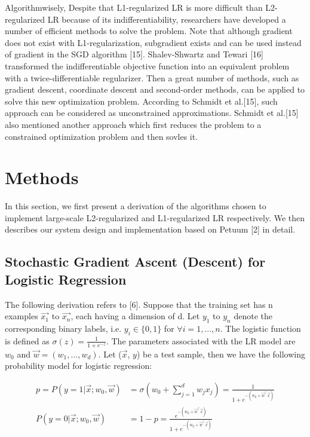 \documentclass{article} %
\begin{document}
Algorithmwisely, Despite that L1-regularized LR is more difficult than L2-regularized LR because of its indifferentiability, researchers have developed a number of efficient methods to solve the problem. Note that although gradient does not exist with L1-regularization, subgradient exists and can be used instead of gradient in the SGD algorithm [15]. Shalev-Shwartz and Tewari [16] transformed the indifferentiable objective function into an equivalent problem with a twice-differentiable regularizer. Then a great number of methods, such as gradient descent, coordinate descent and second-order methods, can be applied to solve this new optimization problem. According to Schmidt et al.[15], such approach can be considered as unconstrained approximations. Schmidt et al.[15] also mentioned another approach which first reduces the problem to a constrained optimization problem and then sovles it.

\section{Methods}
\label{headings}

In this section, we first present a derivation of the algorithms chosen to implement large-scale L2-regularized and L1-regularized LR respectively. We then describes our system design and implementation based on Petuum [2] in detail.

\subsection{Stochastic Gradient Ascent (Descent) for Logistic Regression}

The following derivation refers to [6]. Suppose that the training set has n examples $\vec{x_1}$ to $\vec{x_n}$, each having a dimension of d. Let $y_1$ to $y_n$ denote the corresponding binary labels, i.e. $y_i \in \{0, 1\}$ for $\forall i = 1, ..., n$. The logistic function is defined as $\sigma(z) = \frac{1}{1+e^{-z}}$. The parameters associated with the LR model are $w_0$ and $\vec{w} = (w_1, ..., w_d)$. Let ($\vec{x}$, $y$) be a test sample, then we have the following probability model for logistic regression:

\begin{align*}
    p = P(y=1 | \vec{x}; w_0, \vec{w}) &= \sigma(w_0 + \sum\limits_{j=1}^d w_jx_j) = \frac{1}{1 + e^{-(w_0 + \vec{w}^\top\vec{x})}}\\
    P(y=0 | \vec{x}; w_0, \vec{w}) &= 1 - p = \frac{e^{-(w_0 + \vec{w}^\top\vec{x})}}{1 + e^{-(w_0 + \vec{w}^\top\vec{x})}}
\end{align*}
\end{document}

